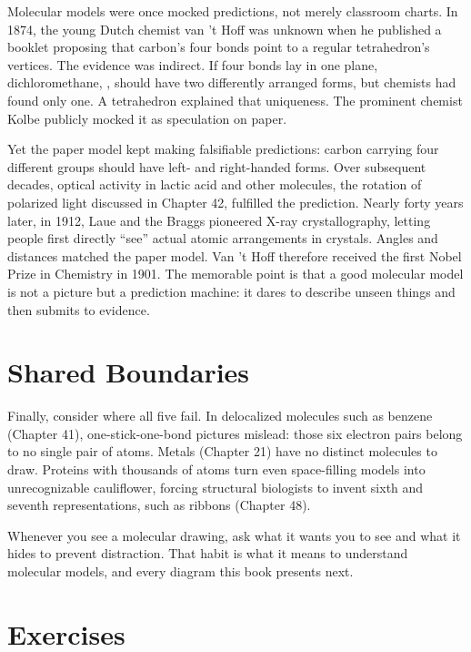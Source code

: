 \begin{zhengju}
Molecular models were once mocked predictions, not merely classroom charts. In 1874, the young Dutch chemist van 't Hoff was unknown when he published a booklet proposing that carbon's four bonds point to a regular tetrahedron's vertices. The evidence was indirect. If four bonds lay in one plane, dichloromethane, , should have two differently arranged forms, but chemists had found only one. A tetrahedron explained that uniqueness. The prominent chemist Kolbe publicly mocked it as speculation on paper.

Yet the paper model kept making falsifiable predictions: carbon carrying four different groups should have left- and right-handed forms. Over subsequent decades, optical activity in lactic acid and other molecules, the rotation of polarized light discussed in Chapter 42, fulfilled the prediction. Nearly forty years later, in 1912, Laue and the Braggs pioneered X-ray crystallography, letting people first directly ``see'' actual atomic arrangements in crystals. Angles and distances matched the paper model. Van 't Hoff therefore received the first Nobel Prize in Chemistry in 1901. The memorable point is that a good molecular model is not a picture but a prediction machine: it dares to describe unseen things and then submits to evidence.
\end{zhengju}

\section{Shared Boundaries}

Finally, consider where all five fail. In delocalized molecules such as benzene (Chapter 41), one-stick-one-bond pictures mislead: those six electron pairs belong to no single pair of atoms. Metals (Chapter 21) have no distinct molecules to draw. Proteins with thousands of atoms turn even space-filling models into unrecognizable cauliflower, forcing structural biologists to invent sixth and seventh representations, such as ribbons (Chapter 48).

Whenever you see a molecular drawing, ask what it wants you to see and what it hides to prevent distraction. That habit is what it means to understand molecular models, and every diagram this book presents next.

\section*{Exercises}

